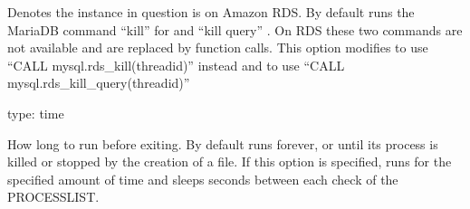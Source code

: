 \documentclass[letterpaper,10pt,english]{sphinxmanual}
\begin{document}
\begin{fulllineitems}
\label{\detokenize{mariadb-kill:cmdoption-mariadb-kill-rds}}
Denotes the instance in question is on Amazon RDS. By default  runs
the MariaDB command “kill” for {\hyperref[\detokenize{mariadb-kill:cmdoption-mariadb-kill-kill}]{}} and “kill query” {\hyperref[\detokenize{mariadb-kill:cmdoption-mariadb-kill-kill-query}]{}}.
On RDS these two commands are not available and are replaced by function calls.
This option modifies {\hyperref[\detokenize{mariadb-kill:cmdoption-mariadb-kill-kill}]{}} to use “CALL mysql.rds\_kill(thread\sphinxhyphen{}id)” instead
and {\hyperref[\detokenize{mariadb-kill:cmdoption-mariadb-kill-kill-query}]{}} to use “CALL mysql.rds\_kill\_query(thread\sphinxhyphen{}id)”

\end{fulllineitems}


\begin{fulllineitems}
\label{\detokenize{mariadb-kill:cmdoption-mariadb-kill-run-time}}
type: time

How long to run before exiting.  By default  runs forever, or until
its process is killed or stopped by the creation of a {\hyperref[\detokenize{mariadb-kill:cmdoption-mariadb-kill-sentinel}]{}} file.
If this option is specified,  runs for the specified amount of time
and sleeps {\hyperref[\detokenize{mariadb-kill:cmdoption-mariadb-kill-interval}]{}} seconds between each check of the PROCESSLIST.

\end{fulllineitems}
\end{document}
